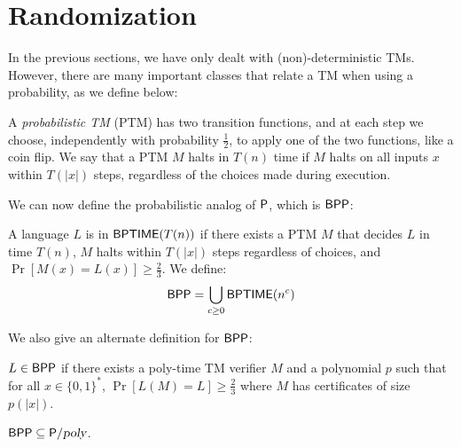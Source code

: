 \section{Randomization}

In the previous sections, we have only dealt with (non)-deterministic TMs. However, there are many important classes that relate a TM when using a probability, as we define below:

\begin{definition}
A \emph{probabilistic TM} (PTM) has two transition functions, and at each step we choose, independently with probability $\frac{1}{2}$, to apply one of the two functions, like a coin flip. We say that a PTM $M$ halts in $T(n)$ time if $M$ halts on all inputs $x$ within $T(|x|)$ steps, regardless of the choices made during execution.
\end{definition}

We can now define the probabilistic analog of $\P$, which is $\BPP$:
\begin{definition}
A language $L$ is in $\BPTIME(T(n))$ if there exists a PTM $M$ that decides $L$ in time $T(n)$, $M$ halts within $T(|x|)$ steps regardless of choices, and $\Pr[M(x) = L(x)] \ge \frac{2}{3}$. We define:
\[
\BPP = \bigcup_{c \ge 0}\BPTIME(n^c)
\]
\end{definition}

We also give an alternate definition for $\BPP$:
\begin{definition}
$L \in \BPP$ if there exists a poly-time TM verifier $M$ and a polynomial $p$ such that for all $x \in \{0, 1\}^*$, $\Pr[L(M) = L] \ge \frac{2}{3}$ where $M$ has certificates of size $p(|x|)$.
\end{definition}

\begin{theorem}
$\BPP \subseteq \Ppoly$.
\end{theorem}

